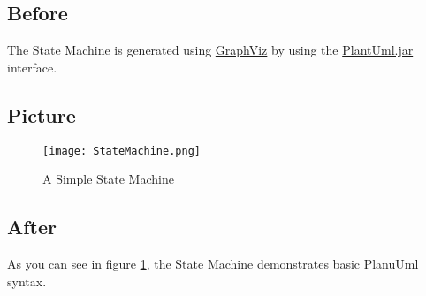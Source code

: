 \documentclass{article}%
\begin{document}
%

  \subsection{Before}%
  The State Machine is generated using
  \href{https://graphviz.org}{GraphViz} by using the
  \href{https://plantuml.com}{PlantUml.jar} interface.

  \subsection{Picture}%

  \begin{figure}[h]%
    \centering%
    \texttt{[image: StateMachine.png]}%
    \caption{A Simple State Machine}%
    \label{fig:statemachine}%
  \end{figure}%

  \subsection{After}%
  As you can see in figure \ref{fig:statemachine}, the State Machine
  demonstrates basic PlanuUml syntax.
\end{document}
